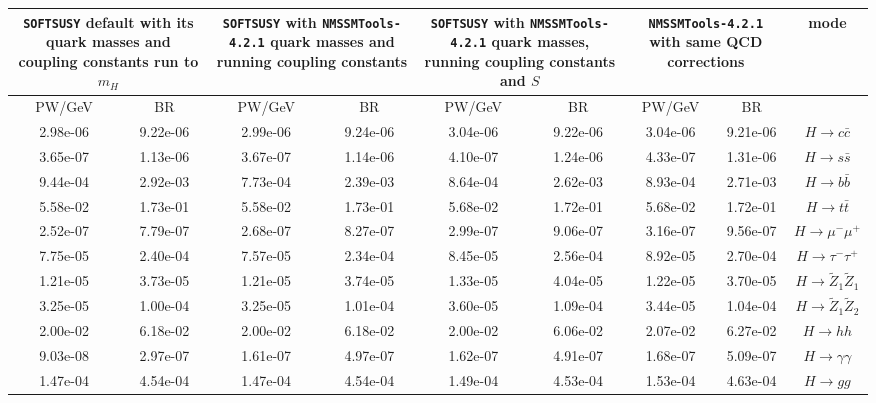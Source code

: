 \documentclass[final,3p,times]{elsarticle}
\begin{document}
\begin{center}
\begin{table} %
\centering
\begin{tabular}{|c|c|c|c|c|c|c|c|c|} \hline
\multicolumn{2}{|C{3.0cm}|}{{\tt SOFTSUSY} default with its quark masses and coupling constants run to $m_{H}$} & \multicolumn{2}{C{3.0cm}|}{{\tt SOFTSUSY} with {\tt NMSSMTools-4.2.1} quark masses and running coupling constants} &
\multicolumn{2}{C{3.0cm}|}{{\tt SOFTSUSY} with {\tt NMSSMTools-4.2.1} quark masses, running coupling constants and $S$} & \multicolumn{2}{C{3.0cm}|}{{\tt NMSSMTools-4.2.1} with same QCD corrections} & mode \\ \hline
PW/GeV & BR & PW/GeV & BR & PW/GeV & BR & PW/GeV & BR & \\ \hline
2.98e-06 & 9.22e-06 & 2.99e-06 & 9.24e-06 & 3.04e-06 & 9.22e-06 & 3.04e-06 & 9.21e-06 & $H \rightarrow c \bar{c}$ \\ \hline
3.65e-07 & 1.13e-06 & 3.67e-07 & 1.14e-06 & 4.10e-07 & 1.24e-06 & 4.33e-07 & 1.31e-06 & $H \rightarrow s \bar{s}$ \\ \hline
9.44e-04 & 2.92e-03 & 7.73e-04 & 2.39e-03 & 8.64e-04 & 2.62e-03 & 8.93e-04 & 2.71e-03 & $H \rightarrow b \bar{b}$ \\ \hline
5.58e-02 & 1.73e-01 & 5.58e-02 & 1.73e-01 & 5.68e-02 & 1.72e-01 & 5.68e-02 & 1.72e-01 & $H \rightarrow t \bar{t}$ \\ \hline
2.52e-07 & 7.79e-07 & 2.68e-07 & 8.27e-07 & 2.99e-07 & 9.06e-07 & 3.16e-07 & 9.56e-07 & $H \rightarrow \mu^- \mu^+$ \\ \hline
7.75e-05 & 2.40e-04 & 7.57e-05 & 2.34e-04 & 8.45e-05 & 2.56e-04 & 8.92e-05 & 2.70e-04 & $H \rightarrow \tau^- \tau^+$ \\ \hline
1.21e-05 & 3.73e-05 & 1.21e-05 & 3.74e-05 & 1.33e-05 & 4.04e-05 & 1.22e-05 & 3.70e-05 & $H \rightarrow \tilde{Z}_1 \tilde{Z}_1$  \\ \hline
3.25e-05 & 1.00e-04 & 3.25e-05 & 1.01e-04 & 3.60e-05 & 1.09e-04 & 3.44e-05 & 1.04e-04 & $H \rightarrow \tilde{Z}_1 \tilde{Z}_2$ \\ \hline
2.00e-02 & 6.18e-02 & 2.00e-02 & 6.18e-02 & 2.00e-02 & 6.06e-02 & 2.07e-02 & 6.27e-02 & $H \rightarrow h h$ \\ \hline
9.03e-08 & 2.97e-07 & 1.61e-07 & 4.97e-07 & 1.62e-07 & 4.91e-07 & 1.68e-07 & 5.09e-07 & $H \rightarrow \gamma \gamma$ \\ \hline
1.47e-04 & 4.54e-04 & 1.47e-04 & 4.54e-04 & 1.49e-04 & 4.53e-04 & 1.53e-04 & 4.63e-04 & $H \rightarrow g g$ \\ \hline

\end{tabular}
\end{table}
\end{center}
\end{document}
